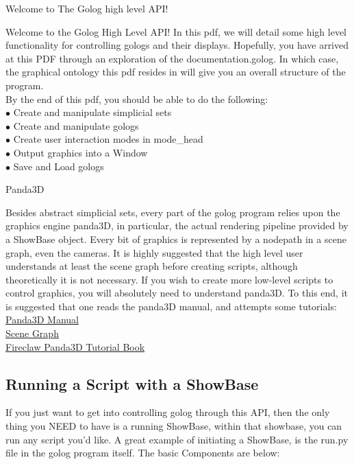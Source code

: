 \documentclass{article}
\begin{document}
\begin{section}{Welcome to The Golog high level API! }
\end{section}
 Welcome to the Golog High Level API! In this pdf, we will detail some high level functionality for controlling gologs and their displays. Hopefully, you have arrived at this PDF through an exploration of the documentation.golog. In which case, the graphical ontology this pdf resides in will give you an overall structure of the program.\\
 
 By the end of this pdf, you should be able to do the following:\\
 
\noindent$\bullet$ Create and manipulate simplicial sets\\
 $\bullet$ Create and manipulate gologs\\
 $\bullet$ Create user interaction modes in mode\_head\\
 $\bullet$ Output graphics into a Window\\
 $\bullet$ Save and Load gologs\\
 
 
 \begin{section}{Panda3D}
 \end{section}
 
 Besides abstract simplicial sets, every part of the golog program relies upon the graphics engine panda3D, in particular, the actual rendering pipeline provided by a ShowBase object. Every bit of graphics is represented by a nodepath in a scene graph, even the cameras. It is highly suggested that the high level user understands at least the scene graph before creating scripts, although theoretically it is not necessary. If you wish to create more low-level scripts to control graphics, you will absolutely need to understand panda3D. To this end, it is suggested that one reads the panda3D manual, and attempts some tutorials:\\
 
 \noindent\href{https://www.panda3d.org/manual/}{Panda3D Manual}\\
 \href{https://www.panda3d.org/manual/?title=The_Scene_Graph}{Scene Graph}\\
 \href{https://grimfang-studio.org/data/books/book1/Panda3D\%20Book\%201.pdf}{Fireclaw Panda3D Tutorial Book}\\
 
 \newpage
 \subsection{Running a Script with a ShowBase}
 If you just want to get into controlling golog through this API, then the only thing you NEED to have is a running ShowBase, within that showbase, you can run any script you'd like. A great example of initiating a ShowBase, is the run.py file in the golog program itself. The basic Components are below:
 
\end{document}
